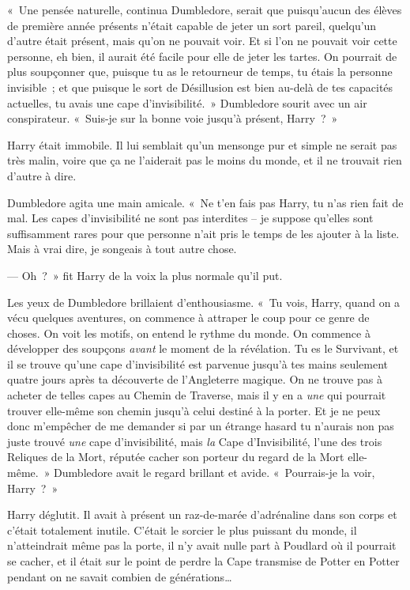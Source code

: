 «~Une pensée naturelle, continua Dumbledore, serait que puisqu'aucun des élèves de première année présents n'était capable de jeter un sort pareil, quelqu'un d'autre était présent, mais qu'on ne pouvait voir.
Et si l'on ne pouvait voir cette personne, eh bien, il aurait été facile pour elle de jeter les tartes.
On pourrait de plus soupçonner que, puisque tu as le retourneur de temps, tu étais la personne invisible~; et que puisque le sort de Désillusion est bien au-delà de tes capacités actuelles, tu avais une cape d'invisibilité.~»
Dumbledore sourit avec un air conspirateur.
«~Suis-je sur la bonne voie jusqu'à présent, Harry~?~»

Harry était immobile.
Il lui semblait qu'un mensonge pur et simple ne serait pas très malin, voire que ça ne l'aiderait pas le moins du monde, et il ne trouvait rien d'autre à dire.

Dumbledore agita une main amicale.
«~Ne t'en fais pas Harry, tu n'as rien fait de mal.
Les capes d'invisibilité ne sont pas interdites -- je suppose qu'elles sont suffisamment rares pour que personne n'ait pris le temps de les ajouter à la liste.
Mais à vrai dire, je songeais à tout autre chose.

--- Oh~?~»
fit Harry de la voix la plus normale qu'il put.

Les yeux de Dumbledore brillaient d'enthousiasme.
«~Tu vois, Harry, quand on a vécu quelques aventures, on commence à attraper le coup pour ce genre de choses.
On voit les motifs, on entend le rythme du monde.
On commence à développer des soupçons \emph{avant} le moment de la révélation.
Tu es le Survivant, et il se trouve qu'une cape d'invisibilité est parvenue jusqu'à tes mains seulement quatre jours après ta découverte de l'Angleterre magique.
On ne trouve pas à acheter de telles capes au Chemin de Traverse, mais il y en a \emph{une} qui pourrait trouver elle-même son chemin jusqu'à celui destiné à la porter.
Et je ne peux donc m'empêcher de me demander si par un étrange hasard tu n'aurais non pas juste trouvé \emph{une} cape d'invisibilité, mais \emph{la} Cape d'Invisibilité, l'une des trois Reliques de la Mort, réputée cacher son porteur du regard de la Mort elle-même.~»
Dumbledore avait le regard brillant et avide.
«~Pourrais-je la voir, Harry~?~»

Harry déglutit.
Il avait à présent un raz-de-marée d'adrénaline dans son corps et c'était totalement inutile.
C'était le sorcier le plus puissant du monde, il n'atteindrait même pas la porte, il n'y avait nulle part à Poudlard où il pourrait se cacher, et il était sur le point de perdre la Cape transmise de Potter en Potter pendant on ne savait combien de générations…

